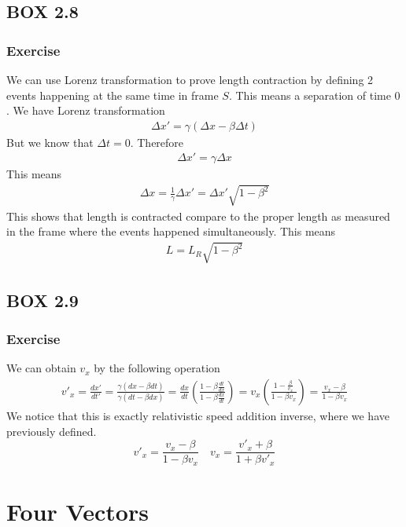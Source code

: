 \documentclass[12pt]{memoir}
\newcommand{\dydx}[2]{\frac{d #1}{d #2}}
\newcommand{\paren}[1]{\left( #1 \right)}
\begin{document}
    \section{BOX 2.8}
        \subsection{Exercise}
        We can use Lorenz transformation to prove length contraction by defining 2 events happening at the same time in frame $S$. This means a separation of time $0$. We have Lorenz transformation
        \begin{align}
        \Delta x' = \gamma\paren{\Delta x - \beta\Delta t}
        \end{align}
        But we know that $\Delta t = 0$. Therefore
        \begin{align}
        \Delta x' = \gamma\Delta x
        \end{align}
        This means
        \begin{align}
        \Delta x = \frac{1}{\gamma}\Delta x' = \Delta x'\sqrt{1-\beta^2}
        \end{align}
        This shows that length is contracted compare to the proper length as measured in the frame where the events happened simultaneously. This means
        \begin{align}
        L = L_R\sqrt{1-\beta^2}
        \end{align}
\newpage
    \section{BOX 2.9}
        \subsection{Exercise}
        We can obtain $v_x$ by the following operation
        \begin{align}
        v'_x = \frac{dx'}{dt'}=\frac{\gamma(dx - \beta dt)}{\gamma(dt - \beta dx)} = \dydx{x}{t}\paren{\frac{1-\beta\frac{dt}{dx}}{1-\beta\frac{dx}{dt}}}= v_x\paren{\frac{1-\frac{\beta}{v_x}}{1-\beta v_x}} = \frac{v_x - \beta}{1 - \beta v_x}
        \end{align}
        We notice that this is exactly relativistic speed addition inverse, where we have previously defined. 
        \[
        v'_x = \frac{v_x - \beta}{1 - \beta v_x} \quad v_x = \frac{v'_x + \beta}{1 + \beta v'_x}
        \]

\begingroup
\let\clearpage\relax
\chapter{Four Vectors}
\endgroup
\end{document}
